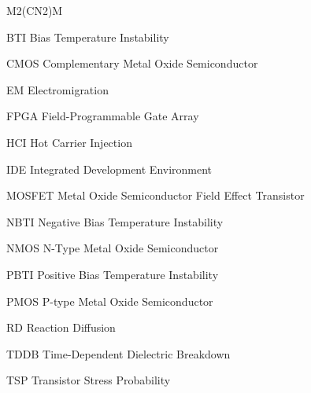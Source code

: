 \begin{listofabbrv}{M2(CN2)M}
        \item[BTI] Bias Temperature Instability
        \item[CMOS] Complementary Metal Oxide Semiconductor
        \item[EM] Electromigration
        \item[FPGA] Field-Programmable Gate Array
        \item[HCI] Hot Carrier Injection
        \item[IDE] Integrated Development Environment
        \item[MOSFET] Metal Oxide Semiconductor Field Effect Transistor
        \item[NBTI] Negative Bias Temperature Instability
        \item[NMOS] N-Type Metal Oxide Semiconductor
        \item[PBTI] Positive Bias Temperature Instability
        \item[PMOS] P-type Metal Oxide Semiconductor       
        \item[RD] Reaction Diffusion
        \item[TDDB] Time-Dependent Dielectric Breakdown
        \item[TSP] Transistor Stress Probability
\end{listofabbrv}